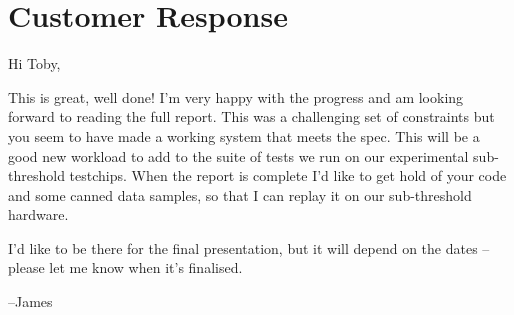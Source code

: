 \chapter{Customer Response}



Hi Toby,

This is great, well done! I'm very happy with the progress and am looking forward to reading the full report. This was a challenging set of constraints but you seem to have made a working system that meets the spec. This will be a good new workload to add to the suite of tests we run on our experimental sub-threshold testchips. When the report is complete I'd like to get hold of your code and some canned data samples, so that I can replay it on our sub-threshold hardware.

I'd like to be there for the final presentation, but it will depend on the dates – please let me know when it's finalised.

--James